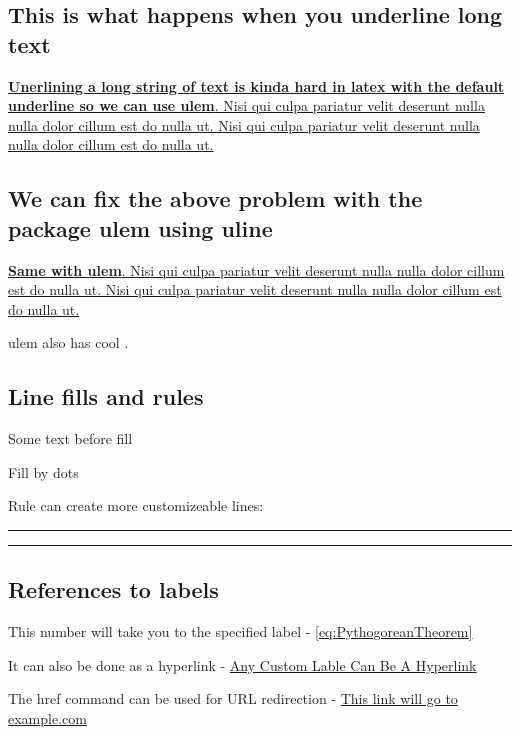 \documentclass[12pt]{article}
\begin{document}
\subsection{This is what happens when you underline long text}
\underline{\textbf{Unerlining a long string of text is kinda hard in latex with the default underline so we can use ulem}. Nisi qui culpa pariatur velit deserunt nulla nulla dolor cillum est do nulla ut. Nisi qui culpa pariatur velit deserunt nulla nulla dolor cillum est do nulla ut.} \\

\subsection{We can fix the above problem with the package ulem using uline}
\uline{\textbf{Same with ulem}. Nisi qui culpa pariatur velit deserunt nulla nulla dolor cillum est do nulla ut. Nisi qui culpa pariatur velit deserunt nulla nulla dolor cillum est do nulla ut.}

{\large \noindent ulem also has  cool .}

\subsection{Line fills and rules}

\noindent \hrulefill

\noindent Some text before fill \hrulefill

\noindent Fill by dots \dotfill

\noindent Rule can create more customizeable lines:

\noindent \rule{\linewidth}{0.4pt}

\begin{center}
    \rule{5cm}{0.4cm}
\end{center}



\subsection{References to labels}

This number will take you to the specified label - \ref{eq:PythogoreanTheorem}

\noindent It can also be done as a hyperlink - \hyperref[eq:PythogoreanTheorem]{Any Custom Lable Can Be A Hyperlink}

\noindent The href command can be used for URL redirection - \href{https://example.com/}{This link will go to example.com}
\end{document}
